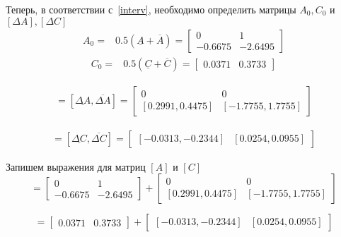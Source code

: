 Теперь, в соответствии с~\ref{interv}, необходимо определить матрицы $A_0, C_0$ и $[\Delta A], [\Delta C]$
\begin{align}
	A_0 =& 0.5 (\underline{A} + \overline{A}) =
	\begin{bmatrix}
		0&1\\
		-0.6675& -2.6495
	\end{bmatrix}
\end{align}
\begin{align}
	C_0 =& 0.5 (\underline{C} + \overline{C}) = 
	\begin{bmatrix}
		0.0371 & 0.3733
	\end{bmatrix}
\end{align}

\begin{align}
	[\Delta A] = [\underline{\Delta A}, \overline{\Delta A}] = 
	\begin{bmatrix}
		0&0\\
		[0.2991, 0.4475] & [-1.7755, 1.7755]
	\end{bmatrix}
\end{align}

\begin{align}
	[\Delta C] = [\underline{\Delta C}, \overline{\Delta C}] = 
	\begin{bmatrix}
		[-0.0313, -0.2344] & [0.0254, 0.0955]
	\end{bmatrix}
\end{align}

Запишем выражения для матриц $[A]$ и $[C]$
\begin{equation}
	[A] =
	\begin{bmatrix}
		0&1\\
		-0.6675& -2.6495
	\end{bmatrix} 
	+
	\begin{bmatrix}
		0&0\\
		[0.2991, 0.4475] & [-1.7755, 1.7755]
	\end{bmatrix}	
\end{equation}

\begin{equation}
	[C] =
	\begin{bmatrix}
		0.0371 & 0.3733
	\end{bmatrix}
	+
	\begin{bmatrix}
		[-0.0313, -0.2344] & [0.0254, 0.0955]
	\end{bmatrix}	
\end{equation}


\newpage